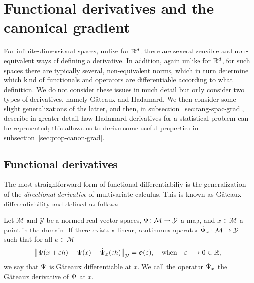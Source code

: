 \documentclass[a4,danish]{article}
\begin{document}
\section{Functional derivatives and the canonical gradient}
\label{sec:funct-deriv-can-grad}

For infinite-dimensional spaces, unlike for $\mathbb{R}^d$, there are several
sensible and non-equivalent ways of defining a derivative. In
addition, again unlike for $\mathbb{R}^d$, for such spaces there are typically
several, non-equivalent norms, which in turn determine which kind of
functionals and operators are differentiable according to what
definition. We do not consider these issues in much detail but only
consider two types of derivatives, namely Gâteaux and Hadamard. We
then consider some slight generalizations of the latter, and then, in
subsection~\ref{sec:tang-spac-grad}, describe in greater detail how
Hadamard derivatives for a statistical problem can be represented;
this allows us to derive some useful properties in
subsection~\ref{sec:prop-canon-grad}.

\subsection{Functional derivatives}
\label{sec:funct-deriv}

The most straightforward form of functional differentiabiliy is the generalization of the
\textit{directional derivative} of multivariate calculus. This is known as Gâteaux differentiability
and defined as follows.

\begin{definition}
  Let $\mathcal{M}$ and $\mathcal{Y}$ be a normed real vector spaces,
  $\operatorname{\Psi} \colon \mathcal{M} \rightarrow \mathcal{Y}$ a map, and $x \in \mathcal{M}$ a point in the
  domain. If there exists a linear, continuous operator
  $\dot{\operatorname{\Psi}}_x \colon \mathcal{M} \rightarrow \mathcal{Y} $ such that for all $h \in \mathcal{M}$
  \begin{equation*}
    \left\Vert
      \TT(x + \epsilon h) - \TT(x) - \dot{\TT}_x(\epsilon h)
    \right\Vert_{\mathcal{Y}} = \smallO(\epsilon),
    \quad \text{when} \quad \epsilon \longrightarrow 0 \in \R,
  \end{equation*}
  we say that $\operatorname{\Psi}$ is Gâteaux differentiable at $x$. We call the operator $\dot{\operatorname{\Psi}}_x$ the
  Gâteaux derivative of $\operatorname{\Psi}$ at $x$.
\end{definition}
\end{document}

